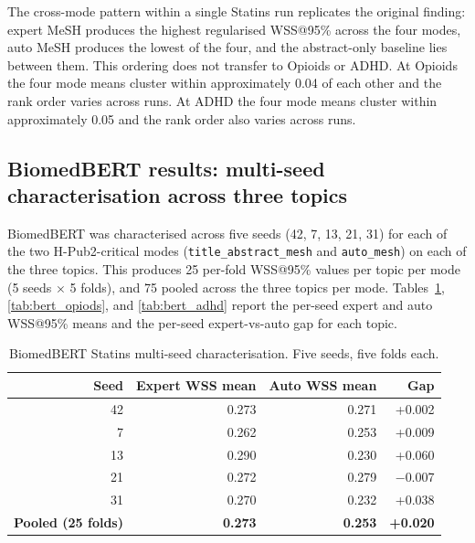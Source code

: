 \documentclass[11pt,a4paper]{article}
\begin{document}
The cross-mode pattern within a single Statins run replicates the original finding: expert MeSH produces the highest regularised WSS@95\% across the four modes, auto MeSH produces the lowest of the four, and the abstract-only baseline lies between them. This ordering does not transfer to Opioids or ADHD. At Opioids the four mode means cluster within approximately 0.04 of each other and the rank order varies across runs. At ADHD the four mode means cluster within approximately 0.05 and the rank order also varies across runs.

\subsection{BiomedBERT results: multi-seed characterisation across three topics}

BiomedBERT was characterised across five seeds (42, 7, 13, 21, 31) for each of the two H-Pub2-critical modes (\texttt{title\_abstract\_mesh} and \texttt{auto\_mesh}) on each of the three topics. This produces 25 per-fold WSS@95\% values per topic per mode (5 seeds $\times$ 5 folds), and 75 pooled across the three topics per mode. Tables~\ref{tab:bert_statins}, \ref{tab:bert_opiods}, and \ref{tab:bert_adhd} report the per-seed expert and auto WSS@95\% means and the per-seed expert-vs-auto gap for each topic.

\begin{table}[h]
\centering
\small
\begin{tabular}{rrrr}
\toprule
Seed & Expert WSS mean & Auto WSS mean & Gap \\
\midrule
42 & 0.273 & 0.271 & +0.002 \\
7  & 0.262 & 0.253 & +0.009 \\
13 & 0.290 & 0.230 & +0.060 \\
21 & 0.272 & 0.279 & $-$0.007 \\
31 & 0.270 & 0.232 & +0.038 \\
\midrule
\textbf{Pooled (25 folds)} & \textbf{0.273} & \textbf{0.253} & \textbf{+0.020} \\
\bottomrule
\end{tabular}
\caption{BiomedBERT Statins multi-seed characterisation. Five seeds, five folds each.}
\label{tab:bert_statins}
\end{table}
\end{document}
